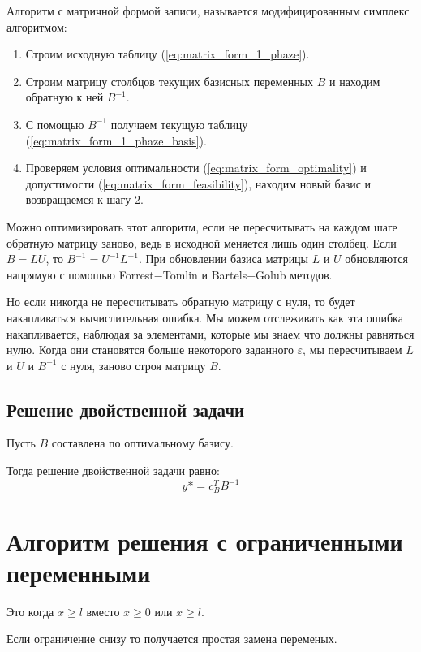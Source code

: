 \documentclass[a4paper,article,14pt]{extarticle}
\let\epsilon = \varepsilon
\begin{document}
Алгоритм с матричной формой записи, называется модифицированным симплекс алгоритмом:

\begin{enumerate}
    \item Строим исходную таблицу (\ref{eq:matrix_form_1_phaze}).
    \item Строим матрицу столбцов текущих базисных переменных \(B\) и находим обратную к ней \(B^{-1}\).
    \item С помощью \(B^{-1}\) получаем текущую таблицу (\ref{eq:matrix_form_1_phaze_basis}).
    \item Проверяем условия оптимальности (\ref{eq:matrix_form_optimality}) и допустимости (\ref{eq:matrix_form_feasibility}), находим новый базис и возвращаемся к шагу 2.
\end{enumerate}

Можно оптимизировать этот алгоритм, если не пересчитывать на каждом шаге обратную матрицу заново, ведь в исходной меняется лишь один столбец. Если \(B = LU\), то \(B^{-1} = U^{-1}L^{-1}\). При обновлении базиса матрицы \(L\) и \(U\) обновляются напрямую с помощью Forrest−Tomlin и Bartels−Golub методов.

Но если никогда не пересчитывать обратную матрицу с нуля, то будет накапливаться вычислительная ошибка.
Мы можем отслеживать как эта ошибка накапливается, наблюдая за элементами, которые мы знаем что должны равняться нулю.
Когда они становятся больше некоторого заданного \(\epsilon\), мы пересчитываем \(L\) и \(U\) и \(B^{-1}\) с нуля, заново строя матрицу \(B\).

\subsection{Решение двойственной задачи}

Пусть \(B\) составлена по оптимальному базису.

Тогда решение двойственной задачи равно:
\begin{equation}
    y* = c_B^TB^{-1}
\end{equation}

\section{Алгоритм решения с ограниченными переменными}

Это когда \(x \ge l\) вместо \(x \ge 0\) или \(x \ge l\).

Если ограничение снизу то получается простая замена переменых.
\end{document}
